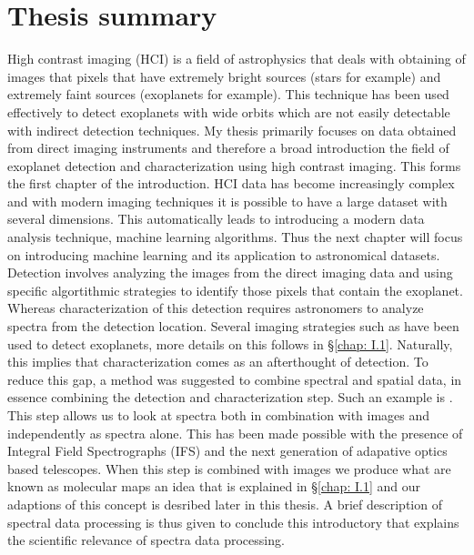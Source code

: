 \chapter*{Thesis summary}
High contrast imaging (HCI) is a field of astrophysics that deals with obtaining of images that pixels that have extremely bright sources (stars for example) and extremely faint sources (exoplanets for example).
This technique has been used effectively to detect exoplanets with wide orbits which are not easily detectable with indirect detection techniques.
My thesis primarily focuses on data obtained from direct imaging instruments and therefore a broad introduction the field of exoplanet detection and characterization\@
using high contrast imaging.
This forms the first chapter of the introduction.
HCI data has become increasingly complex and with modern imaging techniques it is possible to have a large dataset with several dimensions.
This automatically leads to introducing a modern data analysis technique, machine learning algorithms.
Thus the next chapter will focus on introducing machine learning and its application to astronomical datasets.
Detection involves analyzing the images from the direct imaging data and using specific algortithmic strategies to identify those pixels that contain the exoplanet.
Whereas characterization of this detection requires astronomers to analyze spectra from the detection location.
Several imaging strategies such as \citep[ADI, ][]{2006MaroisADI} have been used to detect exoplanets, more details on this follows in 
\S\ref{chap: I.1}.
Naturally, this implies that characterization comes as an afterthought of detection.
To reduce this gap, a method was suggested to combine spectral and spatial data, in essence combining the detection 
and characterization step.
Such an example is \citet[][]{2002SparksSDI}.
This step allows us to look at spectra both in combination with images and independently as spectra alone.
This has been made possible with the presence of Integral Field Spectrographs (IFS) and the next generation of adapative optics based 
telescopes.
When this step is combined with images we produce what are known as molecular maps an idea that is explained in 
\S\ref{chap: I.1} and our adaptions of this concept is desribed later in this thesis.
A brief description of spectral data processing is thus given to conclude this introductory that explains the scientific relevance of spectra data processing.

